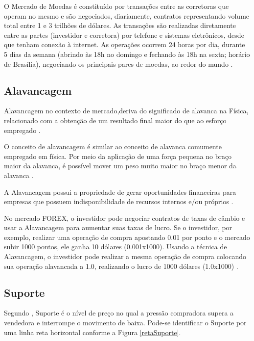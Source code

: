 O Mercado de Moedas é constituído por transações entre as corretoras que operam no mesmo e são negociados, diariamente, contratos representando volume total entre 1 e 3 trilhões de dólares. As transações são realizadas diretamente entre as partes (investidor e corretora) por telefone e sistemas eletrônicos, desde que tenham conexão à internet. As operações ocorrem 24 horas por dia, durante 5 dias da semana (abrindo às 18h no domingo e fechando às 18h na sexta; horário de Brasília), negociando os principais pares de moedas, ao redor do mundo \cite[pág.~4]{cvm2009}.

\subsection{Alavancagem}
Alavancagem no contexto de mercado,deriva do significado de alavanca na Física, relacionado com a obtenção de um resultado final maior do que ao esforço empregado \cite[pág.~3]{dantas2006}.

\begin{citacao}
O conceito de alavancagem é similar ao conceito de alavanca comumente empregado em física. Por meio da aplicação de uma força pequena no braço maior da alavanca, é possível mover um peso muito maior no braço menor da alavanca \cite[pág.~232]{bruni2011}.
\end{citacao}

A Alavancagem possui a propriedade de gerar oportunidades financeiras para empresas que possuem indisponibilidade de recursos internos e/ou próprios \cite[p~13]{albuquerque2013}.

No mercado FOREX, o investidor pode negociar contratos de taxas de câmbio e usar a Alavancagem para aumentar suas taxas de lucro. Se o investidor, por exemplo, realizar uma operação de compra apostando 0.01 por ponto e o mercado subir 1000 pontos, ele ganha 10 dólares (0.001x1000). Usando a técnica de Alavancagem, o investidor pode realizar a mesma operação de compra colocando sua operação alavancada a 1.0, realizando o lucro de 1000 dólares (1.0x1000) \cite{easyforex2014}.

\subsection{Suporte}

Segundo ,  Suporte é o nível de preço no qual a pressão compradora supera a vendedora e interrompe o movimento de baixa. Pode-se identificar o Suporte por uma linha reta horizontal conforme a Figura \ref{retaSuporte}.

